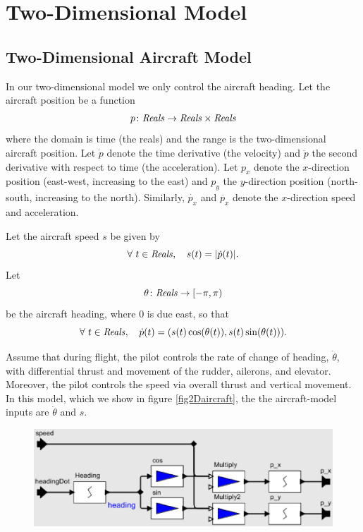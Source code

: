 \documentclass[11pt]{article}
\begin{document}
\section{Two-Dimensional Model}



\subsection{Two-Dimensional Aircraft Model}

In our two-dimensional model we only control the aircraft heading.
Let the aircraft position be a function
\[
p \colon \mbox{\textit{Reals}} \to \mbox{\textit{Reals}} \times \mbox{\textit{Reals}}
\]
where the domain is time (the reals) and the range is the
two-dimensional aircraft position.  Let $\dot{p}$ denote the time
derivative (the velocity) and $\ddot{p}$ the second derivative with
respect to time (the acceleration). Let $p_x$ denote the $x$-direction
position (east-west, increasing to the east) and $p_y$ the
$y$-direction position (north-south, increasing to the
north). Similarly, $\dot{p_x}$ and $\ddot{p_x}$ denote the
$x$-direction speed and acceleration.

Let the aircraft speed $s$ be given by
\[
\forall ~ t \in \mbox{\textit{Reals}}, \quad
s(t) = |\dot{p}(t)| .
\]
Let
\[
\theta \colon \mbox{\textit{Reals}} \to [-\pi, \pi)
\]
be the aircraft heading, where $0$ is due east, so that
\[
\forall ~ t \in \mbox{\textit{Reals}}, \quad
\dot{p} (t) = (s(t) \cos(\theta (t)), s(t) \sin(\theta(t))) .
\]

Assume that during flight, the pilot controls the rate of change of
heading, $\dot{\theta}$, with differential thrust and movement of the
rudder, ailerons, and elevator.  Moreover, the pilot controls the
speed via overall thrust and vertical movement.  In this model, which
we show in figure \ref{fig2Daircraft}, the the aircraft-model inputs
are $\dot{\theta}$ and $s$.

\begin{figure}[btp]
\centering
\includegraphics[width=5in]{fig2Daircraft.eps}
\end{figure}
\end{document}
